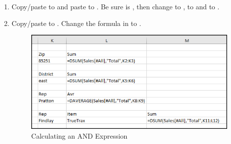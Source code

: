 \begin{enumerate}
	\item Copy/paste  to  and paste  to . Be sure  is , then change  to ,  to  and  to .
	\item Copy/paste  to . Change the formula in  to . 
	
	\begin{figure}[H]
		\centering
		\includegraphics[width=\maxwidth{.95\linewidth}]{gfx/ch09_fig22}
		\caption{Calculating an AND Expression}
		\label{09:fig22}
	\end{figure}
	

\end{enumerate}
